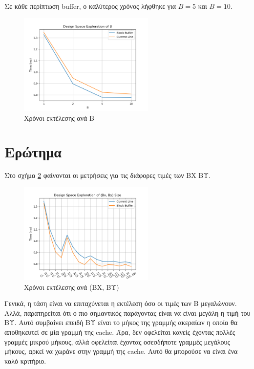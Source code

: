 \documentclass{article}
\newcommand{\eng}[1]{\foreignlanguage{english}{#1}} %
\begin{document}
Σε κάθε περίπτωση \eng{buffer}, ο καλύτερος χρόνος λήφθηκε για $B = 5$ και $B = 10$.

\begin{figure}[h]
    \centering
    \includegraphics[width=0.6\textwidth]{./plots/dse-b.png}
    \caption{Χρόνοι εκτέλεσης ανά Β}
    \label{fig:dse}
\end{figure}
\FloatBarrier

\section{Ερώτημα}

Στο σχήμα \ref{fig:dse-bxby} φαίνονται οι μετρήσεις για τις διάφορες τιμές των ΒΧ ΒΥ.

\begin{figure}[h]
    \centering
    \includegraphics[width=0.6\textwidth]{./plots/dse.png}
    \caption{Χρόνοι εκτέλεσης ανά (ΒΧ, ΒΥ)}
    \label{fig:dse-bxby}
\end{figure}
\FloatBarrier

Γενικά, η τάση είναι να επιταχύνεται η εκτέλεση όσο οι τιμές των Β μεγαλώνουν.
Αλλά, παρατηρείται ότι ο πιο σημαντικός παράγοντας είναι να είναι μεγάλη η 
τιμή του ΒΥ. Αυτό συμβαίνει επειδή ΒΥ είναι το μήκος της γραμμής ακεραίων
η οποία θα αποθηκευτεί σε μία γραμμή της \eng{cache}. Άρα, δεν οφελείται
κανείς έχοντας πολλές γραμμές μικρού μήκους, αλλά οφελείται έχοντας
οσεσδήποτε γραμμές μεγάλους μήκους, αρκεί να χωράνε στην γραμμή
της \eng{cache}. Αυτό θα μπορούσε να είναι ένα καλό κριτήριο.
\end{document}
